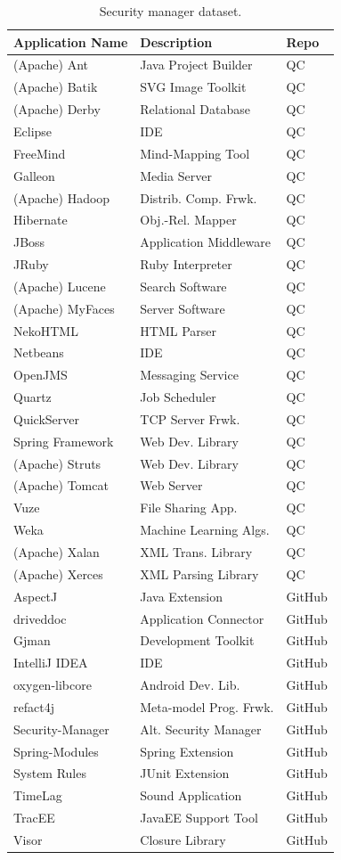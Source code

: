 \documentclass{sig-alternate}
\begin{document}
\begin{table}
\caption{Security manager dataset.\label{Table:applications-studied}}
\begin{tabular}{lll}
\toprule 
Application Name & Description & Repo\tabularnewline
\midrule
(Apache) Ant & Java Project Builder & QC\tabularnewline
(Apache) Batik & SVG Image Toolkit & QC\tabularnewline
(Apache) Derby & Relational Database & QC\tabularnewline
Eclipse  & IDE & QC\tabularnewline
FreeMind & Mind-Mapping Tool & QC\tabularnewline
Galleon & Media Server & QC\tabularnewline
(Apache) Hadoop & Distrib. Comp. Frwk. & QC\tabularnewline
Hibernate & Obj.-Rel. Mapper & QC\tabularnewline
JBoss & Application Middleware & QC\tabularnewline
JRuby & Ruby Interpreter & QC\tabularnewline
(Apache) Lucene & Search Software & QC\tabularnewline
(Apache) MyFaces & Server Software & QC\tabularnewline
NekoHTML & HTML Parser & QC\tabularnewline
Netbeans & IDE & QC\tabularnewline
OpenJMS & Messaging Service & QC\tabularnewline
Quartz  & Job Scheduler & QC\tabularnewline
QuickServer & TCP Server Frwk. & QC\tabularnewline
Spring Framework & Web Dev. Library & QC\tabularnewline
(Apache) Struts & Web Dev. Library & QC\tabularnewline
(Apache) Tomcat & Web Server & QC\tabularnewline
Vuze & File Sharing App. & QC\tabularnewline
Weka & Machine Learning Algs. & QC\tabularnewline
(Apache) Xalan & XML Trans. Library & QC\tabularnewline
(Apache) Xerces & XML Parsing Library & QC\tabularnewline
AspectJ & Java Extension & GitHub\tabularnewline
driveddoc & Application Connector & GitHub\tabularnewline
Gjman & Development Toolkit & GitHub\tabularnewline
IntelliJ IDEA & IDE & GitHub\tabularnewline
oxygen-libcore & Android Dev. Lib. & GitHub\tabularnewline
refact4j & Meta-model Prog. Frwk. & GitHub\tabularnewline
Security-Manager & Alt. Security Manager & GitHub\tabularnewline
Spring-Modules & Spring Extension & GitHub\tabularnewline
System Rules & JUnit Extension & GitHub\tabularnewline
TimeLag & Sound Application & GitHub\tabularnewline
TracEE & JavaEE Support Tool & GitHub\tabularnewline
Visor & Closure Library & GitHub\tabularnewline
\bottomrule
\end{tabular}
\end{table}
\end{document}
